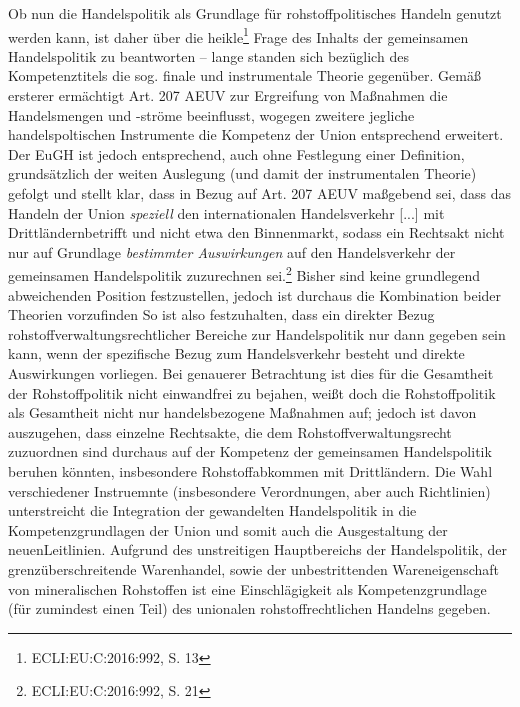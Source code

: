 \documentclass[12pt,a4paper,oneside]{book} %
\begin{document}
Ob nun die Handelspolitik als Grundlage für rohstoffpolitisches Handeln genutzt werden kann, ist daher über die \glqq heikle\grqq \footnote{ECLI:EU:C:2016:992, S. 13} Frage des Inhalts der gemeinsamen Handelspolitik zu beantworten -- lange standen sich bezüglich des Kompetenztitels die sog. finale und instrumentale Theorie gegenüber. Gemäß ersterer ermächtigt Art. 207 AEUV zur Ergreifung von Maßnahmen die Handelsmengen und -ströme beeinflusst, wogegen zweitere jegliche handelspoltischen Instrumente die Kompetenz der Union entsprechend erweitert.\autocite{Callies/Ruffert, Art. 207, Rn. 11} Der EuGH ist jedoch entsprechend, auch ohne Festlegung einer Definition, grundsätzlich der weiten Auslegung (und damit der instrumentalen Theorie) gefolgt und stellt klar, dass in Bezug auf Art. 207 AEUV maßgebend sei, dass das \glqq Handeln der Union \textit{speziell} den internationalen Handelsverkehr [...] mit Drittländern\grqq betrifft und nicht etwa den Binnenmarkt, sodass ein Rechtsakt nicht nur auf Grundlage \textit{bestimmter Auswirkungen} auf den Handelsverkehr der gemeinsamen Handelspolitik zuzurechnen sei.\footnote{ECLI:EU:C:2016:992, S. 21}
Bisher sind  keine grundlegend abweichenden Position festzustellen, jedoch ist durchaus die Kombination beider Theorien vorzufinden\autocites{Callies/Ruffert, Art. 207, Rn. 11}{Müller-Ibold, in: Lenz/Borchardt (Hrsg.), EU-Verträge, Vorb. zu Art. 206, Rn. 4;}{Weiß, in: Grabitz/Hilf/Nettesheim, EU, Art. 207, Rn. 69.}
So ist also festzuhalten, dass ein direkter Bezug rohstoffverwaltungsrechtlicher Bereiche zur Handelspolitik nur dann gegeben sein kann, wenn der spezifische Bezug zum Handelsverkehr besteht und direkte Auswirkungen vorliegen. Bei genauerer Betrachtung ist dies für die Gesamtheit der Rohstoffpolitik nicht einwandfrei zu bejahen, weißt doch die Rohstoffpolitik als Gesamtheit nicht nur handelsbezogene Maßnahmen auf; jedoch ist davon auszugehen, dass einzelne Rechtsakte, die dem Rohstoffverwaltungsrecht zuzuordnen sind durchaus auf der Kompetenz der gemeinsamen Handelspolitik beruhen könnten, insbesondere Rohstoffabkommen mit Drittländern. Die Wahl verschiedener Instruemnte (insbesondere Verordnungen, aber auch Richtlinien) unterstreicht die Integration der gewandelten Handelspolitik in die Kompetenzgrundlagen der Union und somit auch die Ausgestaltung der \glqq neuen\grqq Leitlinien.\autocite{RdTW 2024, 216}
Aufgrund des unstreitigen Hauptbereichs der Handelspolitik, der grenzüberschreitende Warenhandel, sowie der unbestrittenden Wareneigenschaft von mineralischen Rohstoffen ist eine Einschlägigkeit als Kompetenzgrundlage (für zumindest einen Teil) des unionalen rohstoffrechtlichen Handelns gegeben.
\end{document}
